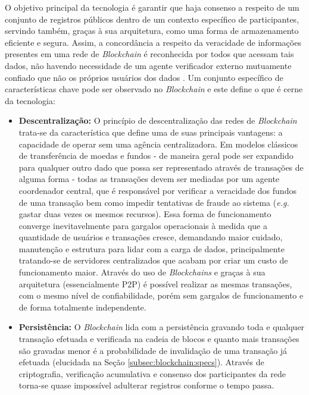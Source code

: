 %
O objetivo principal da tecnologia é garantir que haja consenso a respeito de um conjunto de registros públicos dentro de um contexto específico de participantes, servindo também, graças à sua arquitetura, como uma forma de armazenamento eficiente e segura. Assim, a concordância a respeito da veracidade de informações presentes em uma rede de \textit{Blockchain} é reconhecida por todos que acessam tais dados, não havendo necessidade de um agente verificador externo mutuamente confiado que não os próprios usuários dos dados \cite{blockchain:survey}.
%
Um conjunto específico de características chave pode ser observado no \textit{Blockchain} e este define o que é cerne da tecnologia:
\begin{itemize}
    \item \textbf{Descentralização:} O princípio de descentralização das redes de \textit{Blockchain} trata-se da característica que define uma de suas principais vantagens: a capacidade de operar sem uma agência centralizadora. Em modelos clássicos de transferência de moedas e fundos - de maneira geral pode ser expandido para qualquer outro dado que possa ser representado através de transações de alguma forma - todas as transações devem ser mediadas por um agente coordenador central, que é responsável por verificar a veracidade dos fundos de uma transação bem como impedir tentativas de fraude ao sistema (\textit{e.g.} gastar duas vezes os mesmos recursos). Essa forma de funcionamento converge inevitavelmente para gargalos operacionais à medida que a quantidade de usuários e transações cresce, demandando maior cuidado, manutenção e estrutura para lidar com a carga de dados, principalmente tratando-se de servidores centralizados que acabam por criar um custo de funcionamento maior. Através do uso de \textit{Blockchains} e graças à sua arquitetura (essencialmente \ac{P2P}) é possível realizar as mesmas transações, com o mesmo nível de confiabilidade, porém sem gargalos de funcionamento e de forma totalmente independente.
    \item \textbf{Persistência:} O \textit{Blockchain} lida com a persistência gravando toda e qualquer transação efetuada e verificada na cadeia de blocos e quanto mais transações são gravadas menor é a probabilidade de invalidação de uma transação já efetuada (elucidada na Seção \ref{subsec:blockchain:specs}). Através de criptografia, verificação acumulativa e consenso dos participantes da rede torna-se quase impossível adulterar registros conforme o tempo passa.

\end{itemize}
